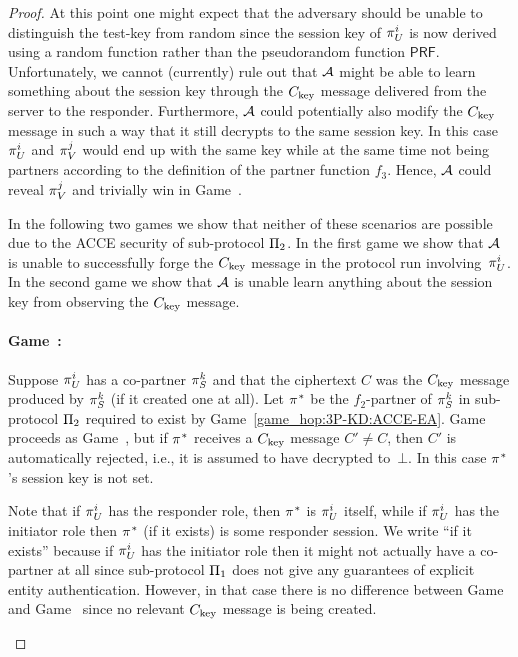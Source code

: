 \begin{proof}
At this point one might expect that the adversary should be unable to distinguish the test-key from random
since the session key of $\oracle[U][i]$ is now derived using a random function rather than the pseudorandom function $\mathsf{PRF}$.
Unfortunately,
we cannot (currently) rule out that $\mathcal{A}$ might be able to learn something about the session key through the $C_{\mathrm{key}}$ message delivered from the server to the responder.
Furthermore,
$\mathcal{A}$ could potentially also modify the $C_{\mathrm{key}}$ message in such a way that it still decrypts to the same session key.
In this case $\oracle[U][i]$ and $\oracle[V][j]$ would end up with the same key while at the same time not being partners according to the definition of the partner function $f_3$.
Hence,
$\mathcal{A}$ could  reveal $\oracle[V][j]$ and trivially win in Game~\game.

In the following two games we show that neither of these scenarios are possible due to the ACCE security of sub-protocol $\mathrm{\Pi}_2$.
In the first game we show that $\mathcal{A}$ is unable to successfully forge the $C_{\mathrm{key}}$ message in the protocol run involving~$\oracle[U][i]$.
In the second game we show that $\mathcal{A}$ is unable learn anything about the session key from observing the $C_{\mathrm{key}}$ message.




\newgame
\paragraph{Game~\game:}\label{game_hop:3P-KD:ACCE-int}
Suppose $\oracle[U][i]$ has a co-partner $\oracle[S][k]$ and that the ciphertext $C$ was the $C_{\mathrm{key}}$ message produced by $\oracle[S][k]$ (if it created one at all).
Let $\oracle^*$ be the $f_2$-partner of $\oracle[S][k]$ in sub-protocol $\mathrm{\Pi}_2$ required to exist by Game~\ref{game_hop:3P-KD:ACCE-EA}.
Game~\game{} proceeds as Game~\prevgame{},
but if $\oracle^*$ receives a $C_{\mathrm{key}}$ message $C' \neq C$,
then $C'$ is automatically rejected,
i.e.,
it is  assumed to have decrypted to~$\bot$.
In this case $\oracle^*$'s session key is not set.



\begin{remark}
Note that if $\oracle[U][i]$ has the responder role,
then $\oracle^*$ is $\oracle[U][i]$ itself,
while if $\oracle[U][i]$ has the initiator role then $\oracle^*$ (if it exists) is some responder session.
We write ``if it exists'' because if $\oracle[U][i]$ has the initiator role
then it might not actually have a co-partner at all since sub-protocol $\mathrm{\Pi}_1$ does not give any guarantees of explicit entity authentication.
However,
in that case there is no difference between Game~\prevgame{} and Game~\game{} since no relevant $C_{\mathrm{key}}$ message is being created.
\end{remark}
 

\end{proof}
